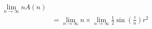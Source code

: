 \documentclass[preview]{standalone}
\begin{document}
\begin{align*}
\lim_{n \to \infty} n A (n) \\ &= \lim_{n \to \infty} n \times \lim_{n \to \infty} \frac {1} {2} \sin \left(\frac {\tau} {n} \right) r^2
\end{align*}
\end{document}
